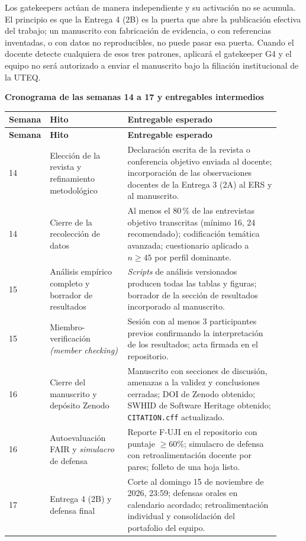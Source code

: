 \documentclass[11pt,a4paper]{article}
\newcounter{secc}
\newcommand{\secband}[1]{%
    \stepcounter{secc}\par\vspace{9pt}\noindent
    {\setlength{\fboxsep}{0pt}%
        \colorbox{uteqgold}{\parbox[c][20pt][c]{0.05\textwidth}{\centering\textbf{\color{white}\small \arabic{secc}}}}%
        \colorbox{uteqgreen}{\parbox[c][20pt][c]{0.95\textwidth}{\hspace{8pt}\textbf{\color{white}\small #1}}}%
    }\par\vspace{5pt}}
\newcommand{\hh}[1]{\cellcolor{uteqgreen}\textbf{\color{white}\small #1}}
\begin{document}
\begin{alertbox}[title=Regla operativa de la rúbrica --- síntesis]
    Los gatekeepers actúan de manera independiente y su activación no se acumula.
    El principio es que la Entrega 4 (2B) es la puerta que abre la publicación efectiva del trabajo; un manuscrito con fabricación de evidencia, o con referencias inventadas, o con datos no reproducibles, no puede pasar esa puerta.
    Cuando el docente detecte cualquiera de esos tres patrones, aplicará el gatekeeper G4 y el equipo no será autorizado a enviar el manuscrito bajo la filiación institucional de la UTEQ.
\end{alertbox}
\secband{Cronograma de las semanas 14 a 17 y entregables intermedios}

\begin{longtable}{@{}p{0.08\linewidth} p{0.28\linewidth} p{0.55\linewidth}@{}}
    \hh{Semana} & \hh{Hito} & \hh{Entregable esperado}\\
    \endfirsthead
    \hh{Semana} & \hh{Hito} & \hh{Entregable esperado}\\
    \endhead
    14 & Elección de la revista y refinamiento metodológico & Declaración escrita de la revista o conferencia objetivo enviada al docente; incorporación de las observaciones docentes de la Entrega 3 (2A) al ERS y al manuscrito.\\
    14 & Cierre de la recolección de datos & Al menos el 80\,\% de las entrevistas objetivo transcritas (mínimo 16, 24 recomendado); codificación temática avanzada; cuestionario aplicado a $n \geq 45$ por perfil dominante.\\
    15 & Análisis empírico completo y borrador de resultados & \emph{Scripts} de análisis versionados producen todas las tablas y figuras; borrador de la sección de resultados incorporado al manuscrito.\\
    15 & Miembro-verificación \emph{(member checking)} & Sesión con al menos 3 participantes previos confirmando la interpretación de los resultados; acta firmada en el repositorio.\\
    16 & Cierre del manuscrito y depósito Zenodo & Manuscrito con secciones de discusión, amenazas a la validez y conclusiones cerradas; DOI de Zenodo obtenido; SWHID de Software Heritage obtenido; \texttt{CITATION.cff} actualizado.\\
    16 & Autoevaluación FAIR y \emph{simulacro} de defensa & Reporte F-UJI en el repositorio con puntaje $\geq 60\%$; simulacro de defensa con retroalimentación docente por pares; folleto de una hoja listo.\\
    17 & Entrega 4 (2B) y defensa final & Corte al domingo 15 de noviembre de 2026, 23:59; defensas orales en calendario acordado; retroalimentación individual y consolidación del portafolio del equipo.\\
\end{longtable}
\end{document}
